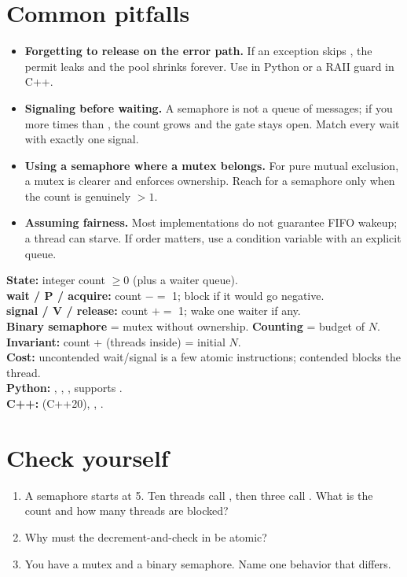 \documentclass[11pt]{article}
\begin{document}
\section{Common pitfalls}
\begin{itemize}[leftmargin=1.2em]
\item \textbf{Forgetting to release on the error path.} If an exception skips , the permit leaks and the pool shrinks forever. Use  in Python or a RAII guard in C++.
\item \textbf{Signaling before waiting.} A semaphore is not a queue of messages; if you  more times than , the count grows and the gate stays open. Match every wait with exactly one signal.
\item \textbf{Using a semaphore where a mutex belongs.} For pure mutual exclusion, a mutex is clearer and enforces ownership. Reach for a semaphore only when the count is genuinely $>1$.
\item \textbf{Assuming fairness.} Most implementations do not guarantee FIFO wakeup; a thread can starve. If order matters, use a condition variable with an explicit queue.
\end{itemize}

\begin{keypoint}[title={Reference}]
\textbf{State:} integer count $\ge 0$ (plus a waiter queue).\\
\textbf{wait / P / acquire:} count $-=$ 1; block if it would go negative.\\
\textbf{signal / V / release:} count $+=$ 1; wake one waiter if any.\\
\textbf{Binary semaphore} = mutex without ownership. \textbf{Counting} = budget of $N$.\\
\textbf{Invariant:} count + (threads inside) = initial $N$.\\
\textbf{Cost:} uncontended wait/signal is a few atomic instructions; contended blocks the thread.\\
\textbf{Python:} , , , supports .\\
\textbf{C++:}  (C++20), , .
\end{keypoint}

\section{Check yourself}
\begin{enumerate}[leftmargin=1.2em]
\item A semaphore starts at 5. Ten threads call , then three call . What is the count and how many threads are blocked?
\item Why must the decrement-and-check in  be atomic?
\item You have a mutex and a binary semaphore. Name one behavior that differs.
\end{enumerate}
\end{document}
